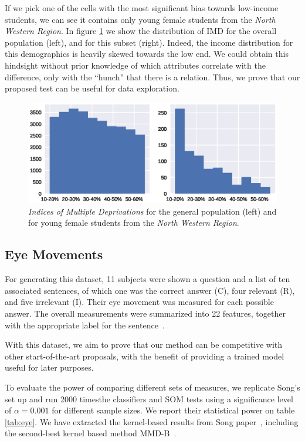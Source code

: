 If we pick one of the cells with the most significant bias towards low-income students,
we can see it contains only young female students from the \emph{North Western Region}.
In figure \ref{fig:oulad_hist} we show the distribution of IMD for the overall population (left),
and for this subset (right). Indeed, the income distribution for this demographics is
heavily skewed towards the low end. We could obtain this hindsight without prior knowledge of which
attributes correlate with the difference, only with the ``hunch'' that
there is a relation. Thus, we prove that our proposed test can be useful for data exploration.

\begin{figure}[htbp]
    \centering
    \includegraphics[width=\textwidth]{images/4_som/imd_histogram.eps}
    \caption{\emph{Indices of Multiple Deprivations} for the general population (left) and for
    young female students from the \emph{North Western Region}.}
    \label{fig:oulad_hist}
\end{figure}

\subsection{Eye Movements}
\label{subsec:som_eye}
For generating this dataset, 11 subjects were shown a question and a list of ten 
associated sentences, of which one was the correct answer (C), four relevant (R), and five
irrelevant (I). Their eye movement was measured for each possible answer.
The overall measurements were summarized into 22 features, together with the
appropriate label for the sentence~\cite{salojarvi2005inferring}.

With this dataset, we aim to prove that our method can be competitive with other
start-of-the-art proposals, with the benefit of providing a trained model useful for
later purposes.

To evaluate the power of comparing different sets of measures, we replicate Song's
set up and run 2000 times\footnotemark the classifiers and \gls{SOM}  tests using a significance
level of $\alpha = 0.001$ for different sample sizes.
We report their statistical power on table \ref{tab:eye}. We have extracted the kernel-based
results from Song \etal paper~\cite{song2021fast}, including the second-best kernel
based method MMD-B~\cite{zaremba2013b}.

